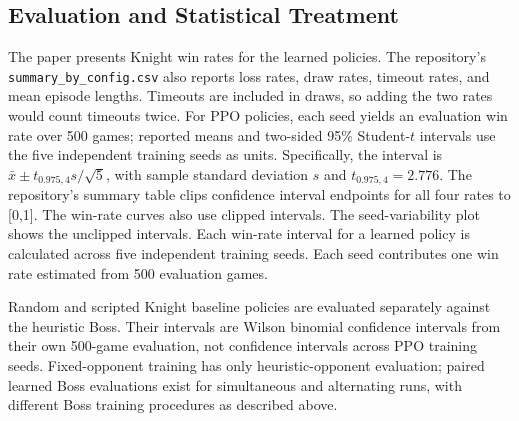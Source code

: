 \documentclass{article}
\begin{document}
\subsection{Evaluation and Statistical Treatment}
The paper presents Knight win rates for the learned policies. The repository’s \texttt{summary\_by\_config.csv} also reports loss rates, draw rates, timeout rates, and mean episode lengths. Timeouts are included in draws, so adding the two rates would count timeouts twice. For PPO policies, each seed yields an evaluation win rate over 500 games; reported means and two-sided 95\% Student-$t$ intervals use the five independent training seeds as units. Specifically, the interval is $\bar{x}\pm t_{0.975,4}s/\sqrt{5}$, with sample standard deviation $s$ and $t_{0.975,4}=2.776$. The repository’s summary table clips confidence interval endpoints for all four rates to [0,1]. The win-rate curves also use clipped intervals. The seed-variability plot shows the unclipped intervals. Each win-rate interval for a learned policy is calculated across five independent training seeds. Each seed contributes one win rate estimated from 500 evaluation games.

Random and scripted Knight baseline policies are evaluated separately against the heuristic Boss. Their intervals are Wilson binomial confidence intervals from their own 500-game evaluation, not confidence intervals across PPO training seeds. Fixed-opponent training has only heuristic-opponent evaluation; paired learned Boss evaluations exist for simultaneous and alternating runs, with different Boss training procedures as described above.
\end{document}
